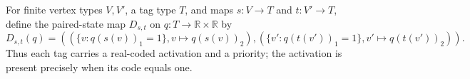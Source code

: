 \begin{definition}
For finite vertex types $V,V'$, a tag type $T$, and maps $s:V\to T$ and
$t:V'\to T$, define the paired-state map $D_{s,t}$ on
$q:T\to\mathbb R\times\mathbb R$ by
\[
D_{s,t}(q)=((\{v:q(s(v))_1=1\},v\mapsto q(s(v))_2),
 (\{v':q(t(v'))_1=1\},v'\mapsto q(t(v'))_2)).
\]
Thus each tag carries a real-coded activation and a priority; the activation
is present precisely when its code equals one.
\end{definition}
